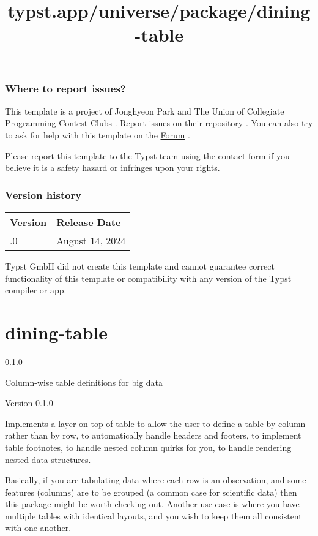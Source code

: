 \subsubsection{Where to report issues?}\label{where-to-report-issues}

This template is a project of Jonghyeon Park and The Union of Collegiate
Programming Contest Clubs . Report issues on
\href{https://github.com/ShapeLayer/ucpc-solutions__typst}{their
repository} . You can also try to ask for help with this template on the
\href{https://forum.typst.app}{Forum} .

Please report this template to the Typst team using the
\href{https://typst.app/contact}{contact form} if you believe it is a
safety hazard or infringes upon your rights.

\label{versions}
\subsubsection{Version history}\label{version-history}

\begin{longtable}[]{@{}ll@{}}
\toprule\noalign{}
Version & Release Date \\
\midrule\noalign{}
\endhead
\bottomrule\noalign{}
\endlastfoot
0.1.0 & August 14, 2024 \\
\end{longtable}

Typst GmbH did not create this template and cannot guarantee correct
functionality of this template or compatibility with any version of the
Typst compiler or app.


\title{typst.app/universe/package/dining-table}

\label{banner}
\section{dining-table}\label{dining-table}

{ 0.1.0 }

Column-wise table definitions for big data

\label{readme}
Version 0.1.0

Implements a layer on top of table to allow the user to define a table
by column rather than by row, to automatically handle headers and
footers, to implement table footnotes, to handle nested column quirks
for you, to handle rendering nested data structures.

Basically, if you are tabulating data where each row is an observation,
and some features (columns) are to be grouped (a common case for
scientific data) then this package might be worth checking out. Another
use case is where you have multiple tables with identical layouts, and
you wish to keep them all consistent with one another.


